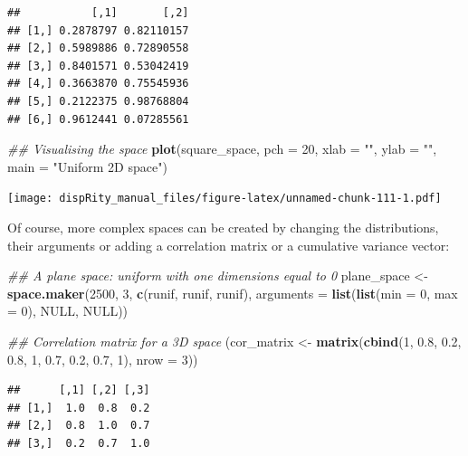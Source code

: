 \documentclass[]{book}
\newenvironment{Shaded}{\begin{snugshade}}{\end{snugshade}}
\newcommand{\CommentTok}[1]{\textcolor[rgb]{0.56,0.35,0.01}{\textit{#1}}}
\newcommand{\DataTypeTok}[1]{\textcolor[rgb]{0.13,0.29,0.53}{#1}}
\newcommand{\DecValTok}[1]{\textcolor[rgb]{0.00,0.00,0.81}{#1}}
\newcommand{\FloatTok}[1]{\textcolor[rgb]{0.00,0.00,0.81}{#1}}
\newcommand{\KeywordTok}[1]{\textcolor[rgb]{0.13,0.29,0.53}{\textbf{#1}}}
\newcommand{\NormalTok}[1]{#1}
\newcommand{\OtherTok}[1]{\textcolor[rgb]{0.56,0.35,0.01}{#1}}
\newcommand{\StringTok}[1]{\textcolor[rgb]{0.31,0.60,0.02}{#1}}
\begin{document}
\begin{verbatim}
##           [,1]       [,2]
## [1,] 0.2878797 0.82110157
## [2,] 0.5989886 0.72890558
## [3,] 0.8401571 0.53042419
## [4,] 0.3663870 0.75545936
## [5,] 0.2122375 0.98768804
## [6,] 0.9612441 0.07285561
\end{verbatim}

\begin{Shaded}
\begin{Highlighting}[]
\CommentTok{## Visualising the space}
\KeywordTok{plot}\NormalTok{(square_space, }\DataTypeTok{pch =} \DecValTok{20}\NormalTok{, }\DataTypeTok{xlab =} \StringTok{""}\NormalTok{, }\DataTypeTok{ylab =} \StringTok{""}\NormalTok{,}
     \DataTypeTok{main =} \StringTok{"Uniform 2D space"}\NormalTok{)}
\end{Highlighting}
\end{Shaded}

\texttt{[image: dispRity\_manual\_files/figure-latex/unnamed-chunk-111-1.pdf]}

Of course, more complex spaces can be created by changing the distributions, their arguments or adding a correlation matrix or a cumulative variance vector:

\begin{Shaded}
\begin{Highlighting}[]
\CommentTok{## A plane space: uniform with one dimensions equal to 0}
\NormalTok{plane_space <-}\StringTok{ }\KeywordTok{space.maker}\NormalTok{(}\DecValTok{2500}\NormalTok{, }\DecValTok{3}\NormalTok{, }\KeywordTok{c}\NormalTok{(runif, runif, runif),}
                           \DataTypeTok{arguments =} \KeywordTok{list}\NormalTok{(}\KeywordTok{list}\NormalTok{(}\DataTypeTok{min =} \DecValTok{0}\NormalTok{, }\DataTypeTok{max =} \DecValTok{0}\NormalTok{),}
                           \OtherTok{NULL}\NormalTok{, }\OtherTok{NULL}\NormalTok{))}

\CommentTok{## Correlation matrix for a 3D space}
\NormalTok{(cor_matrix <-}\StringTok{ }\KeywordTok{matrix}\NormalTok{(}\KeywordTok{cbind}\NormalTok{(}\DecValTok{1}\NormalTok{, }\FloatTok{0.8}\NormalTok{, }\FloatTok{0.2}\NormalTok{, }\FloatTok{0.8}\NormalTok{, }\DecValTok{1}\NormalTok{, }\FloatTok{0.7}\NormalTok{, }\FloatTok{0.2}\NormalTok{, }\FloatTok{0.7}\NormalTok{, }\DecValTok{1}\NormalTok{), }\DataTypeTok{nrow =} \DecValTok{3}\NormalTok{))}
\end{Highlighting}
\end{Shaded}

\begin{verbatim}
##      [,1] [,2] [,3]
## [1,]  1.0  0.8  0.2
## [2,]  0.8  1.0  0.7
## [3,]  0.2  0.7  1.0
\end{verbatim}
\end{document}

